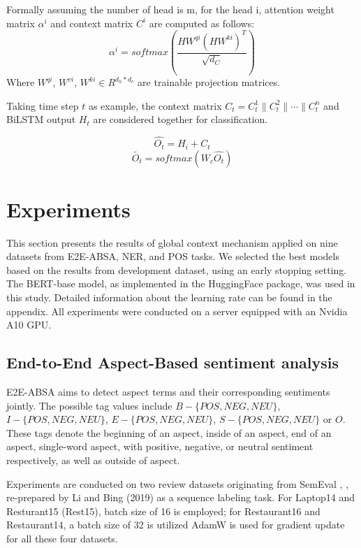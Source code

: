 \documentclass[lettersize,journal]{IEEEtran}
\begin{document}
Formally assuming the number of head is m, for the head i, attention weight matrix $\alpha^{i}$ and context matrix $C^{i}$ are computed as follows:
\begin{equation}
\alpha^{i} = softmax(\frac{HW^{qi}(HW^{ki})^{T}}{\sqrt{d_C}})
\end{equation}
Where $W^{qi}$, $W^{vi}$, $W^{ki} \in R^{d_h*d_c }$ are trainable projection matrices.

Taking time step $t$ as example, the context matrix $C_t = C_t^1 \parallel C_t^2 \parallel  \cdots \parallel C_t^n$ and BiLSTM output $H_t$ are considered together for classification.

\begin{equation}
\hat{O_t} = H_i + C_t
\end{equation}
\begin{equation}
\tilde{O_t} = softmax(W_c \hat{O_t})
\end{equation}
\section{Experiments}
This section presents the results of global context mechanism applied on nine datasets from E2E-ABSA, NER, and POS tasks. We selected the best models based on the results from development dataset, using an early stopping setting. The BERT-base model, as implemented in the HuggingFace package, was used in this study. Detailed information about the learning rate can be found in the appendix. All experiments were conducted on a server equipped with an Nvidia A10 GPU.
\subsection{End-to-End Aspect-Based sentiment analysis}
E2E-ABSA aims to detect aspect terms and their corresponding sentiments jointly. The possible tag values include $B-\{POS,NEG,NEU\}$, 
$I-\{POS,NEG,NEU\}$, $E-\{POS,NEG,NEU\}$, $S-\{POS,NEG,NEU\}$ or $O$. These tags denote the beginning of an aspect, inside of an aspect, end of an aspect, single-word aspect, with positive, negative, or neutral sentiment respectively, as well as outside of aspect. 

Experiments are conducted on two review datasets originating from SemEval \cite{Pontiki2014}, \cite{Pontiki2015}, \cite{Pontiki2016}  re-prepared by Li and Bing (2019) \cite{Li2019} as a sequence labeling task. For Laptop14 and Resturant15 (Rest15), batch size of 16 is employed; for Restaurant16 and Restaurant14, a batch size of 32 is utilized AdamW is used for gradient update for all these four datasets.
\end{document}
